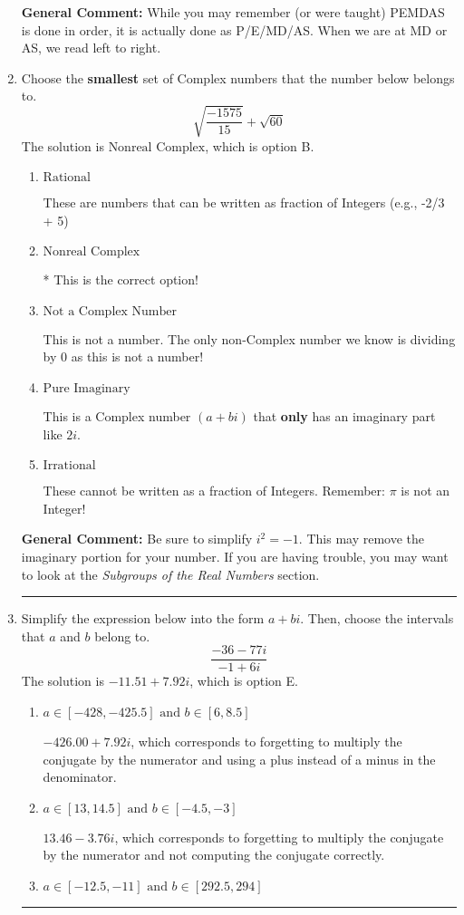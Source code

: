 \documentclass{extbook}[14pt]
\newcommand{\litem}[1]{\item #1

\rule{\textwidth}{0.4pt}}
\begin{document}
\begin{enumerate}
{\textbf{General Comment:} While you may remember (or were taught) PEMDAS is done in order, it is actually done as P/E/MD/AS. When we are at MD or AS, we read left to right.
}
\litem{
Choose the \textbf{smallest} set of Complex numbers that the number below belongs to.
\[ \sqrt{\frac{-1575}{15}}+\sqrt{60} \]The solution is \( \text{Nonreal Complex} \), which is option B.\begin{enumerate}[label=\Alph*.]
\item \( \text{Rational} \)

These are numbers that can be written as fraction of Integers (e.g., -2/3 + 5)
\item \( \text{Nonreal Complex} \)

* This is the correct option!
\item \( \text{Not a Complex Number} \)

This is not a number. The only non-Complex number we know is dividing by 0 as this is not a number!
\item \( \text{Pure Imaginary} \)

This is a Complex number $(a+bi)$ that \textbf{only} has an imaginary part like $2i$.
\item \( \text{Irrational} \)

These cannot be written as a fraction of Integers. Remember: $\pi$ is not an Integer!
\end{enumerate}

\textbf{General Comment:} Be sure to simplify $i^2 = -1$. This may remove the imaginary portion for your number. If you are having trouble, you may want to look at the \textit{Subgroups of the Real Numbers} section.
}
\litem{
Simplify the expression below into the form $a+bi$. Then, choose the intervals that $a$ and $b$ belong to.
\[ \frac{-36 - 77 i}{-1 + 6 i} \]The solution is \( -11.51  + 7.92 i \), which is option E.\begin{enumerate}[label=\Alph*.]
\item \( a \in [-428, -425.5] \text{ and } b \in [6, 8.5] \)

 $-426.00  + 7.92 i$, which corresponds to forgetting to multiply the conjugate by the numerator and using a plus instead of a minus in the denominator.
\item \( a \in [13, 14.5] \text{ and } b \in [-4.5, -3] \)

 $13.46  - 3.76 i$, which corresponds to forgetting to multiply the conjugate by the numerator and not computing the conjugate correctly.
\item \( a \in [-12.5, -11] \text{ and } b \in [292.5, 294] \)


\end{enumerate}}
\end{enumerate}
\end{document}
